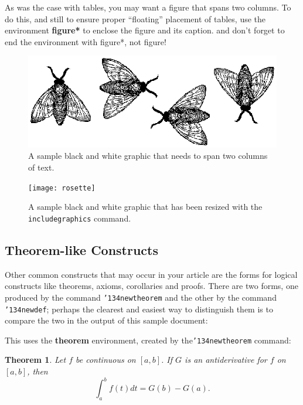 \documentclass{sig-alternate-05-2015}
\begin{document}
As was the case with tables, you may want a figure
that spans two columns.  To do this, and still to
ensure proper ``floating'' placement of tables, use the environment
\textbf{figure*} to enclose the figure and its caption.
and don't forget to end the environment with
{figure*}, not {figure}!

\begin{figure}
\centering
\includegraphics{flies}
\caption{A sample black and white graphic
that needs to span two columns of text.}
\end{figure}


\begin{figure}
\centering
\texttt{[image: rosette]}
\caption{A sample black and white graphic that has
been resized with the \texttt{includegraphics} command.}
\vskip -6pt
\end{figure}

\subsection{Theorem-like Constructs}
Other common constructs that may occur in your article are
the forms for logical constructs like theorems, axioms,
corollaries and proofs.  There are
two forms, one produced by the
command \texttt{{\char'134}newtheorem} and the
other by the command \texttt{{\char'134}newdef}; perhaps
the clearest and easiest way to distinguish them is
to compare the two in the output of this sample document:

This uses the \textbf{theorem} environment, created by
the\linebreak\texttt{{\char'134}newtheorem} command:
\newtheorem{theorem}{Theorem}
\begin{theorem}
Let $f$ be continuous on $[a,b]$.  If $G$ is
an antiderivative for $f$ on $[a,b]$, then
\begin{displaymath}\int^b_af(t)dt = G(b) - G(a).\end{displaymath}
\end{theorem}
\end{document}
